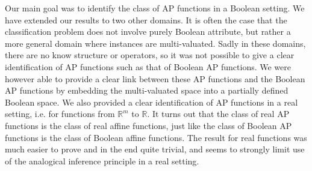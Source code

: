 Our main goal was to identify the class of AP functions in a Boolean setting.
We have extended our results to two other domains. It is often the case that
the classification problem does not involve purely Boolean attribute, but
rather a more general domain where instances are multi-valuated. Sadly in these
domains, there are no know structure or operators, so it was not possible to
give a clear identification of AP functions such as that of Boolean AP
functions. We were however able to provide a clear link between these AP
functions and the Boolean AP functions by embedding the multi-valuated space
into a partially defined Boolean space. We also provided a clear identification
of AP functions in a real setting, i.e. for functions from $\mathbb{R}^m$ to
$\mathbb{R}$. It turns out that the class of real AP functions is the class of
real affine functions, just like the class of Boolean AP functions is the class
of Boolean affine functions. The result for real functions was much easier to
prove and in the end quite trivial, and seems to strongly limit use of the
analogical inference principle in a real setting.
